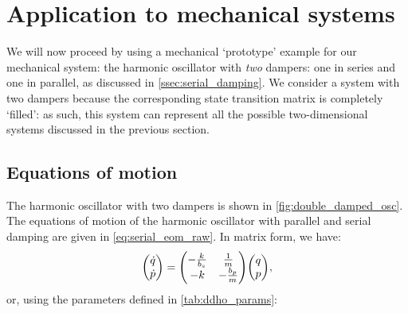 \section{Application to mechanical systems}
\label{sec:mechanical}
We will now proceed by using a mechanical `prototype' example for our mechanical system: the harmonic oscillator with \emph{two} dampers: one in series and one in parallel, as discussed in \cref{ssec:serial_damping}. We consider a system with two dampers because the corresponding state transition matrix is completely `filled': as such, this system can represent all the possible two-dimensional systems discussed in the previous section. %

\subsection{Equations of motion}
The harmonic oscillator with two dampers is shown in \cref{fig:double_damped_osc}. 
The equations of motion of the harmonic oscillator with parallel and serial damping are given in \cref{eq:serial_eom_raw}. In matrix form, we have:
\begin{equation*}
    \mqty(\dot{q}\\\dot{p}) = \mqty(-\tfrac{k}{b_s} & \tfrac{1}{m} \\ -k & - \tfrac{b_p}{m})\mqty(q \\ p),
\end{equation*}
or, using the parameters defined in \cref{tab:ddho_params}:
